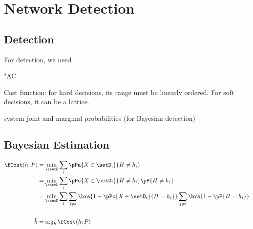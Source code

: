 ﻿%

\chapter{Network Detection}

\section{Detection}
For detection, we need 
\begin{dingautolist}{"AC}
  \item Cost function: for hard decisions, its range must be linearly ordered.
    For soft decisions, it can be a lattice.
  \item system joint and marginal probabilities (for Bayesian detection)
\end{dingautolist}


\section{Bayesian Estimation}
\begin{definition}
\end{definition}

\begin{align*}
 \fCost(h;P)
    &= \min_\ssetD \sum_i \pPa{X \in \setD_i}{H\ne h_i}
  \\&= \min_\ssetD \sum_i \pPc{X \in \setD_i}{H\ne h_i} \pP{H\ne h_i}
  \\&= \min_\ssetD \sum_i 
                   \sum_{j\ne i}\brs{1-\pPc{X \in \setD_i}{H=h_i}}
                   \sum_{j\ne i}\brs{1-\pP{H=h_i}}
  \\
  \\
  \hat{h}
    &= \arg_h \fCost(h;P)
\end{align*}

